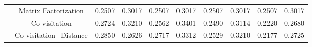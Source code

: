 \begin{table*}[]
\begin{tabular}{|c|c|c|c|c|c|c|c|c|c|}
                       & Matrix Factorization    & 0.2507        & 0.3017       & 0.2507        & 0.3017       & 0.2507        & 0.3017       & 0.2507        & 0.3017       \\ \cline{2-10} 
                       & Co-visitation           & 0.2724        & 0.3210       & 0.2562        & 0.3401       & 0.2490        & 0.3114       & 0.2220        & 0.2680       \\ \cline{2-10} 
                       & Co-visitation+Distance  & 0.2850        & 0.2626       & 0.2717        & 0.3312       & 0.2529        & 0.3210       & 0.2177        & 0.2725       \\ \hline
\end{tabular}
\end{table*}



